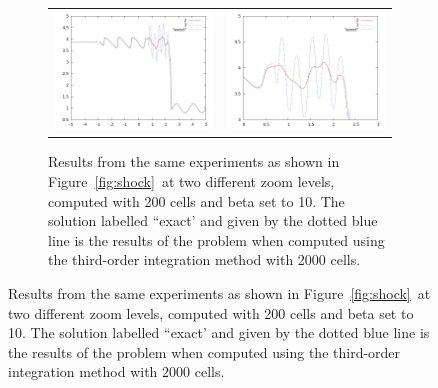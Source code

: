 \documentclass[10pt]{article}
\begin{document}
\begin{figure}[h]
\begin{figure}
  \begin{center}
	\begin{tabular}{cc}
      \includegraphics[width=.475\textwidth]{10.png} &
	  \includegraphics[width=.475\textwidth]{10zoom.png}
	\end{tabular}
  \end{center}
  \caption{Results from the same experiments as shown in Figure~\ref{fig:shock}~at two different zoom levels, computed with 200 cells and beta set to 10. The solution labelled ``exact' and given by the dotted blue line is the results of the problem when computed using the third-order integration method with 2000 cells.}
\end{figure}


\end{figure}
\end{document}
